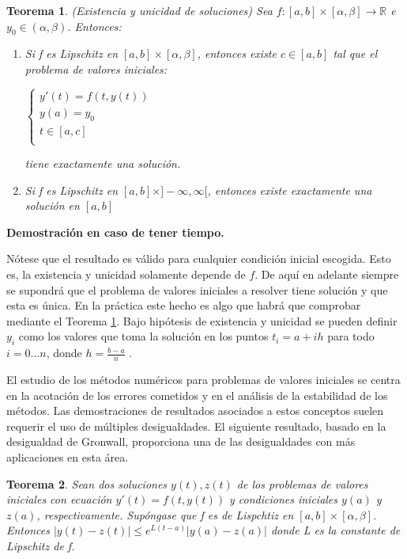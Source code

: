 \documentclass{article}
\theoremstyle{theorem-style}  %
\newtheorem{theorem}{Teorema}[section]  %
\theoremstyle{definition}
\theoremstyle{example-style}
\begin{document}
	\begin{theorem} \label{theorem:existence-uniqueness}
		(Existencia y unicidad de soluciones) Sea $f: [a,b]\times[\alpha,\beta] \rightarrow \mathbb{R}$ e $y_0 \in (\alpha,\beta)$. Entonces:
		\begin{enumerate}
			\item Si f es Lipschitz en $[a,b]\times[\alpha,\beta]$, entonces existe $c \in [a,b]$ tal que el problema de valores iniciales:
			\begin{center}
				$\begin{cases}
				y'(t) = f(t,y(t)) \\
				y(a) = y_0 \\
				t \in [a,c] \\
				\end{cases}$
			\end{center}
			tiene exactamente una solución. 
			\item Si f es Lipschitz en $[a,b]\times]-\infty,\infty[$, entonces existe exactamente una solución en $[a,b]$	
		\end{enumerate}
	\end{theorem}
	
	\textbf{Demostración en caso de tener tiempo.}
 
	Nótese que el resultado es válido para cualquier condición inicial escogida. Esto es, la existencia y unicidad solamente depende de $f$. De aquí en adelante siempre se supondrá que el problema de valores iniciales a resolver tiene solución y que esta es única. En la práctica este hecho es algo que habrá que comprobar mediante el Teorema \ref{theorem:existence-uniqueness}. Bajo hipótesis de existencia y unicidad se pueden definir $y_i$ como los valores que toma la solución en los puntos $t_i = a + ih$ para todo $i = 0 \ldots n$, donde $h = \frac{b-a}{n}$ .
 
	El estudio de los métodos numéricos para problemas de valores iniciales se centra en la acotación de los errores cometidos y en el análisis de la estabilidad de los métodos. Las demostraciones de resultados asociados a estos conceptos suelen requerir el uso de múltiples desigualdades. El siguiente resultado, basado en la desigualdad de Gronwall, proporciona una de las desigualdades con más aplicaciones en esta área.
	
	\begin{theorem}
		Sean dos soluciones $y(t), z(t)$ de los problemas de valores iniciales con ecuación $y'(t) = f(t,y(t))$ y condiciones iniciales $y(a)$ y $z(a)$, respectivamente. Supóngase que f es de Lispchtiz en $[a,b]\times[\alpha,\beta]$. Entonces $|y(t)-z(t)| \leq e^{L(t-a)}|y(a)-z(a)|$ donde L es la constante de Lipschitz de f.
	\end{theorem}
\end{document}
